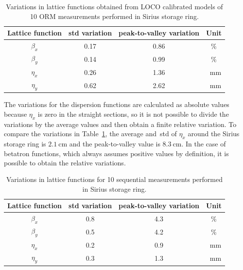 \begin{table}
    \centering
    \caption{Variations in lattice functions obtained from LOCO calibrated models of 10 ORM measurements performed in Sirius storage ring.}
    \label{tab:twiss_var}
    \begin{tabular}{cccc}
        \toprule\toprule
        Lattice function & std variation & peak-to-valley variation & Unit \\
        \hline
        $\beta_x$ & \num{0.17}& \num{0.86} & \%\\
        $\beta_y$ & \num{0.14} & \num{0.99}& \% \\
        $\eta_x$ & \num{0.26} & \num{1.36} & \SI{}{\milli\meter}\\
        $\eta_y$ & \num{0.62} & \num{2.62} & \SI{}{\milli\meter} \\
        \bottomrule\bottomrule
    \end{tabular}
\end{table}

The variations for the dispersion functions are calculated as absolute values because $\eta_x$ is zero in the straight sections, so it is not possible to divide the variations by the average values and then obtain a finite relative variation. To compare the variations in Table~\ref{tab:twiss_var}, the average and~\gls{std} of $\eta_x$ around the Sirius storage ring is $\SI{2.1}{\cm}$ and the peak-to-valley value is $\SI{8.3}{\cm}$. In the case of betatron functions, which always assumes positive values by definition, it is possible to obtain the relative variations.

\begin{table}
    \centering
    \caption{Variations in lattice functions for 10 sequential measurements performed in Sirius storage ring.}
    \label{tab:twiss_var_meas}
    \begin{tabular}{cccc}
        \toprule\toprule
        Lattice function & std variation & peak-to-valley variation & Unit \\
        \hline
        $\beta_x$ & \num{0.8}& \num{4.3} & \%\\
        $\beta_y$ & \num{0.5} & \num{4.2}& \% \\
        $\eta_x$ & \num{0.2} & \num{0.9} & \SI{}{\milli\meter}\\
        $\eta_y$ & \num{0.3} & \num{1.3} & \SI{}{\milli\meter} \\
        \bottomrule\bottomrule
    \end{tabular}
\end{table}
